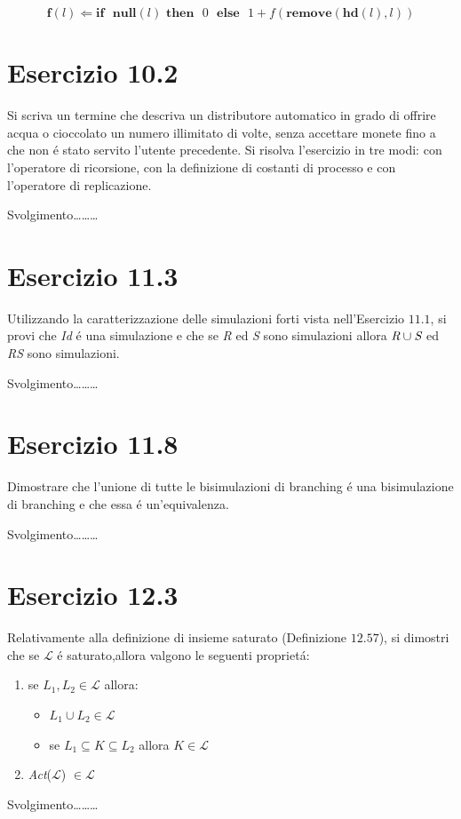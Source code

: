 		$$\textbf{f}(l) \Leftarrow \textbf{if}\text{ }\textbf{null}(l)\text{
		}\textbf{then}\text{ }0\text{ }\textbf{else}\text{ }1 +
		f(\textbf{remove}(\textbf{hd}(l),l))$$
		
		\newpage
		
	\section{Esercizio 10.2}
		\qquad Si scriva un termine che descriva un distributore automatico in grado
		di offrire acqua o cioccolato un numero illimitato di volte, senza accettare
		monete fino a che non \'e stato servito l'utente precedente. Si risolva
		l'esercizio in tre modi: con l'operatore di ricorsione, con la definizione di
		costanti di processo e con l'operatore di replicazione.
		
		\sectionline
		
		\qquad Svolgimento\ldots\ldots\ldots
		
		\newpage
		
	\section{Esercizio 11.3}
		\qquad Utilizzando la caratterizzazione delle simulazioni forti vista
		nell'Esercizio $11.1$, si provi che \emph{Id} \'e una simulazione e che se
		\emph{R} ed \emph{S} sono simulazioni allora $\emph{R} \cup \emph{S}$ ed
		\emph{RS} sono simulazioni.
		
		\sectionline
		
		\qquad Svolgimento\ldots\ldots\ldots
		
		\newpage
		
	\section{Esercizio 11.8}
		\qquad Dimostrare che l'unione di tutte le bisimulazioni di branching \'e una
		bisimulazione di branching e che essa \'e un'equivalenza.
		
		\sectionline
		
		\qquad Svolgimento\ldots\ldots\ldots
		
		\newpage
		
	\section{Esercizio 12.3}
		\qquad Relativamente alla definizione di insieme saturato (Definizione
		$12.57$), si dimostri che se $\mathcal{L}$ \'e saturato,allora valgono le
		seguenti propriet\'a:
		\begin{enumerate}
		  \item se $L_1,L_2 \in \mathcal{L}$ allora:
		  \begin{itemize}
		    \item $L_1 \cup L_2 \in \mathcal{L}$
		    \item se $L_1 \subseteq K \subseteq L_2$ allora $K \in \mathcal{L}$
		  \end{itemize}
		  \item \emph{Act}($\mathcal{L}$) $\in \mathcal{L}$
		\end{enumerate}
		
		\sectionline
		
		\qquad Svolgimento\ldots\ldots\ldots